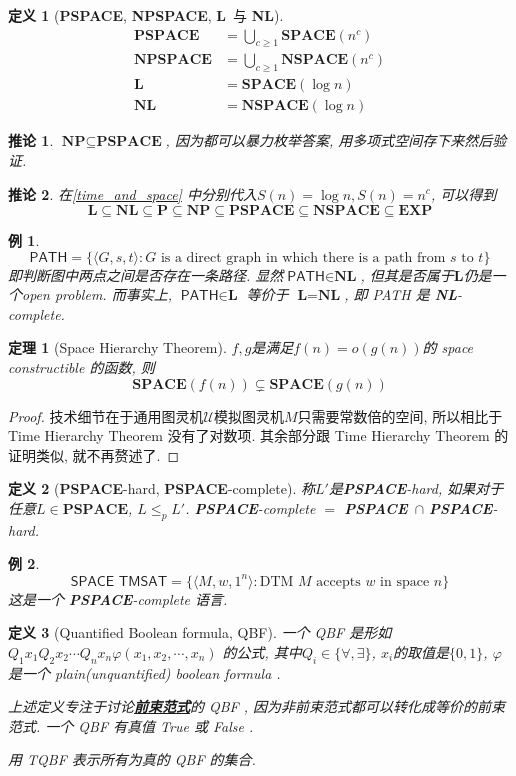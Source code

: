 \documentclass[8pt]{article}
\theoremstyle{compact}
\newtheorem{theorem}{定理}[section]
\newtheorem{definition}{定义}[section]
\newtheorem{corollary}{推论}[section]
\newtheorem{example}{例}[section]
\def\obj#1{\textbf{\uline{#1}}}
\def\le{\leqslant}
\def\ge{\geqslant}
\def\P{\textbf{P}}
\def\NP{\textbf{NP}}
\def\EXP{\textbf{EXP}}
\def\SPACE{\textbf{SPACE}}
\def\NSPACE{\textbf{NSPACE}}
\def\PSPACE{\textbf{PSPACE}}
\def\NPSPACE{\textbf{NPSPACE}}
\def\L{\textbf{L}}
\def\NL{\textbf{NL}}
\begin{document}
\begin{definition}[\PSPACE, \NPSPACE, \L \ 与 \NL]
	\begin{align*}
		\PSPACE &= \bigcup_{c \ge 1}\SPACE(n^c)\\
		\NPSPACE &= \bigcup_{c \ge 1}\NSPACE(n^c)\\
		\L &= \SPACE(\log n)\\
		\NL &= \NSPACE(\log n)
	\end{align*}
\end{definition}
\begin{corollary}
	$\NP \subseteq \PSPACE$, 因为都可以暴力枚举答案, 用多项式空间存下来然后验证. 
\end{corollary}
\begin{corollary}
	在\cref{time_and_space} 中分别代入$S(n) = \log n, S(n) = n^c$, 可以得到
	$$\L \subseteq \NL \subseteq \P \subseteq \NP \subseteq \PSPACE \subseteq \NSPACE \subseteq \EXP$$
\end{corollary}
\begin{example}
	$$\textsf{PATH} = \{ \langle G, s, t\rangle : G \textrm{ is a direct graph in which there is a path from }s \textrm{ to } t\}$$
	即判断图中两点之间是否存在一条路径. 显然$\textsf{PATH} \in \NL$, 但其是否属于$\L$仍是一个open problem. 而事实上, $\textsf{PATH} \in \L$ 等价于 $\L = \NL$, 即 \textsf{PATH} 是 \NL-complete.
\end{example}
\begin{theorem}[Space Hierarchy Theorem]
	$f, g$是满足$f(n) = o(g(n))$的 space constructible 的函数, 则
	$$\SPACE(f(n)) \subsetneq \SPACE(g(n))$$
\end{theorem}
\begin{proof}
	技术细节在于通用图灵机$\mathcal U$模拟图灵机$M$只需要常数倍的空间, 所以相比于 Time Hierarchy Theorem 没有了对数项. 其余部分跟 Time Hierarchy Theorem 的证明类似, 就不再赘述了. 	
\end{proof}
\begin{definition}[\PSPACE-hard, \PSPACE-complete]
	称$L'$是\PSPACE-hard, 如果对于任意$L \in \PSPACE$, $L \le_p L'$. \PSPACE-complete $=$ \PSPACE\ $\cap$ \PSPACE-hard.  
\end{definition}
\begin{example}
	$$\textsf{SPACE TMSAT} = \{ \langle M, w, 1^n \rangle : \textrm{DTM } M \textrm{ accepts } w \textrm{ in space } n \}$$
	这是一个 \PSPACE-complete 语言. 
\end{example}
\begin{definition}[Quantified Boolean formula, QBF]
	一个 QBF 是形如 $Q_1x_1Q_2x_2 \cdots Q_nx_n \varphi(x_1, x_2, \cdots, x_n)$ 的公式, 其中$Q_i \in \{\forall, \exists\}$, $x_i$的取值是$\{0, 1\}$, $\varphi$是一个 plain(unquantified) boolean formula . 

	上述定义专注于讨论\obj{前束范式}的 QBF , 因为非前束范式都可以转化成等价的前束范式. 一个 QBF 有真值 True 或 False . 

	用 \textsf{TQBF} 表示所有为真的 QBF 的集合. 
\end{definition}
\end{document}

